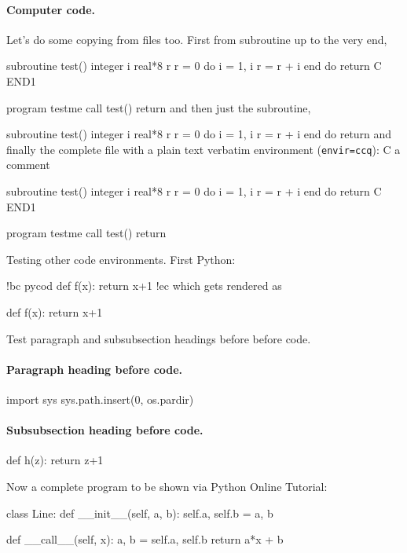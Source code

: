 \documentclass[%
oneside,                 %
final,                   %
10pt]{article}
\theoremstyle{definition}
\begin{document}

\paragraph{Computer code.}
Let's do some copying from files too. First from subroutine up to the very end,

\bfcod
      subroutine test()
      integer i
      real*8 r
      r = 0
      do i = 1, i
         r = r + i
      end do
      return
C     END1

      program testme
      call test()
      return
\efcod
and then just the subroutine,
\bfcod

      subroutine test()
      integer i
      real*8 r
      r = 0
      do i = 1, i
         r = r + i
      end do
      return
\efcod
and finally the complete file with a plain text verbatim environment
(\texttt{envir=ccq}):
\bccq
C     a comment

      subroutine test()
      integer i
      real*8 r
      r = 0
      do i = 1, i
         r = r + i
      end do
      return
C     END1

      program testme
      call test()
      return
\eccq

Testing other code environments. First Python:

\bccq
!bc pycod
def f(x):
    return x+1
!ec
\eccq
which gets rendered as

\bpycod
def f(x):
    return x+1
\epycod

Test paragraph and subsubsection headings before
before code.

\paragraph{Paragraph heading before code.}

\bpycod
import sys
sys.path.insert(0, os.pardir)
\epycod

\paragraph{Subsubsection heading before code.}
\bpycod
def h(z):
    return z+1
\epycod

Now a complete program to be shown via Python Online Tutorial:

\bpypro
class Line:
    def __init__(self, a, b):
        self.a, self.b = a, b

    def __call__(self, x):
        a, b = self.a, self.b
        return a*x + b
\end{document}
